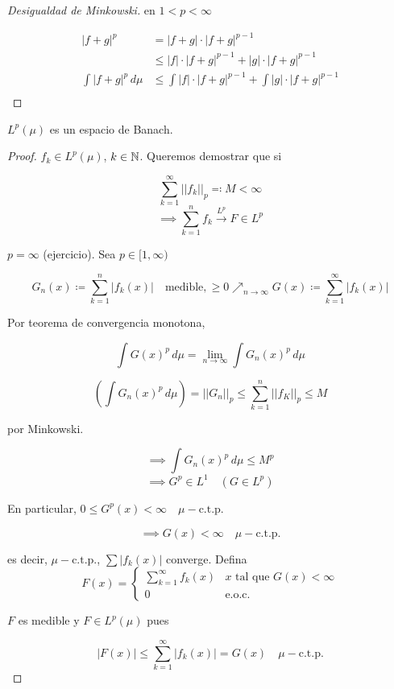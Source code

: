 \begin{proof}[Desigualdad de Minkowski]
    en $1<p<\infty$ 

    \begin{align*}
        |f+g|^p&=|f+g|\cdot |f+g|^{p-1}\\
        &\leq |f|\cdot |f+g|^{p-1}+|g|\cdot |f+g|^{p-1}\\
        \int|f+g|^p\,d\mu&\leq \int |f|\cdot |f+g|^{p-1}+\int |g|\cdot |f+g|^{p-1}\\
    \end{align*}
\end{proof}

\begin{ftheorem}
    $L^p(\mu)$ es un espacio de Banach.
\end{ftheorem}

\begin{proof}
    $f_k\in L^p(\mu)$, $k\in\mathbb{N}$. Queremos demostrar que si 

    \[\sum_{k=1}^\infty ||f_k||_p\eqqcolon M<\infty\]
    \[\implies \sum_{k=1}^n f_k\xrightarrow{L^p}F\in L^p\]

    $p=\infty$ (ejercicio). Sea $p\in[1,\infty)$

    \[G_n(x)\coloneqq \sum_{k=1}^n |f_k(x)|\quad \text{medible}, \geq 0\nearrow_{n\to\infty} G(x)\coloneqq \sum_{k=1}^\infty |f_k(x)|\]

    Por teorema de convergencia monotona,

    \[\int G(x)^p\,d\mu=\lim_{n\to\infty}\int G_n(x)^p\,d\mu\]

    \[\left(\int G_n(x)^p\,d\mu\right)=||G_n||_p\leq \sum_{k=1}^n ||f_K||_p\leq M\]

    por Minkowski.

    \[\implies \int G_n(x)^p\,d\mu\leq M^p\]
    \[\implies G^p\in L^1\quad (G\in L^p)\]

    En particular, $0\leq G^p(x)<\infty\quad \mu-\text{c.t.p.}$

    \[\implies G(x)<\infty\quad \mu-\text{c.t.p.}\]

    es decir, $\mu-\text{c.t.p.}$, $\sum |f_k(x)|$ converge. Defina
    \[F(x)=\begin{cases}
        \sum_{k=1}^\infty f_k(x) &x \text{ tal que } G(x)<\infty\\
        0&\text{e.o.c.}
    \end{cases}\]

    $F$ es medible y $F\in L^p(\mu)$ pues

    \[|F(x)|\leq \sum_{k=1}^\infty |f_k(x)|=G(x)\quad \mu-\text{c.t.p.}\]


\end{proof}
